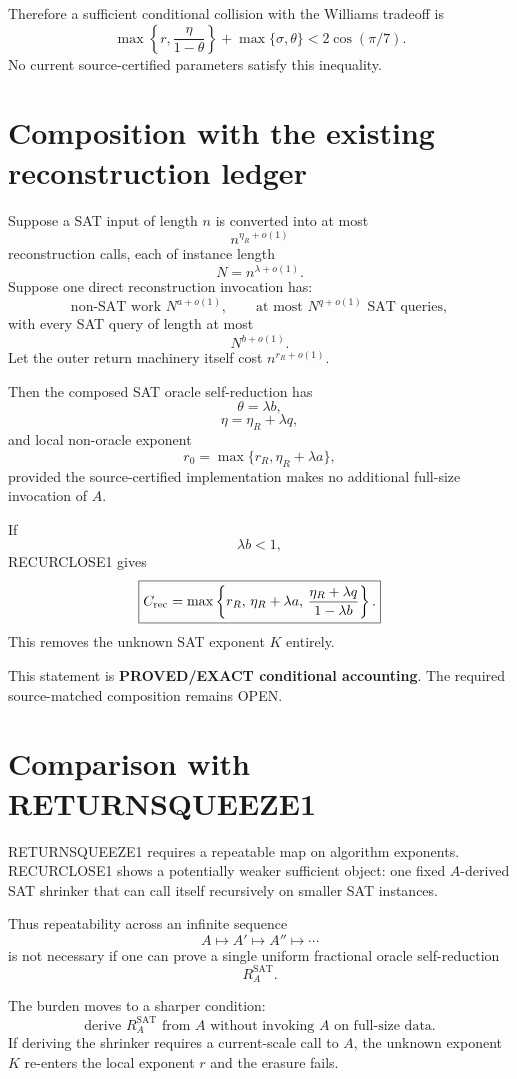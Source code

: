 \documentclass[11pt]{article}
\begin{document}
Therefore a sufficient conditional collision with the Williams tradeoff is
\[
\boxed{
\max\left\{r,\frac{\eta}{1-\theta}\right\}
+
\max\{\sigma,\theta\}
<
2\cos(\pi/7).
}
\]
No current source-certified parameters satisfy this inequality.

\section*{Composition with the existing reconstruction ledger}
Suppose a SAT input of length \(n\) is converted into at most
\[
n^{\eta_R+o(1)}
\]
reconstruction calls, each of instance length
\[
N=n^{\lambda+o(1)}.
\]
Suppose one direct reconstruction invocation has:
\[
\text{non-SAT work }N^{a+o(1)},
\qquad
\text{at most }N^{q+o(1)}\text{ SAT queries},
\]
with every SAT query of length at most
\[
N^{b+o(1)}.
\]
Let the outer return machinery itself cost \(n^{r_R+o(1)}\).

Then the composed SAT oracle self-reduction has
\[
\theta=\lambda b,
\]
\[
\eta=\eta_R+\lambda q,
\]
and local non-oracle exponent
\[
r_0=\max\{r_R,\eta_R+\lambda a\},
\]
provided the source-certified implementation makes no additional full-size invocation of \(A\).

If
\[
\boxed{\lambda b<1,}
\]
RECURCLOSE1 gives
\[
\boxed{
C_{\rm rec}
=
\max\left\{
r_R,\,
\eta_R+\lambda a,\,
\frac{\eta_R+\lambda q}{1-\lambda b}
\right\}.
}
\]
This removes the unknown SAT exponent \(K\) entirely.

This statement is \textbf{PROVED/EXACT conditional accounting}. The required source-matched composition remains OPEN.

\section*{Comparison with RETURNSQUEEZE1}
RETURNSQUEEZE1 requires a repeatable map on algorithm exponents. RECURCLOSE1 shows a potentially weaker sufficient object: one fixed \(A\)-derived SAT shrinker that can call itself recursively on smaller SAT instances.

Thus repeatability across an infinite sequence
\[
A\mapsto A'\mapsto A''\mapsto\cdots
\]
is not necessary if one can prove a single uniform fractional oracle self-reduction
\[
R_A^{\mathrm{SAT}}.
\]

The burden moves to a sharper condition:
\[
\boxed{
\text{derive }R_A^{\mathrm{SAT}}\text{ from }A
\text{ without invoking }A\text{ on full-size data.}
}
\]
If deriving the shrinker requires a current-scale call to \(A\), the unknown exponent \(K\) re-enters the local exponent \(r\) and the erasure fails.
\end{document}
